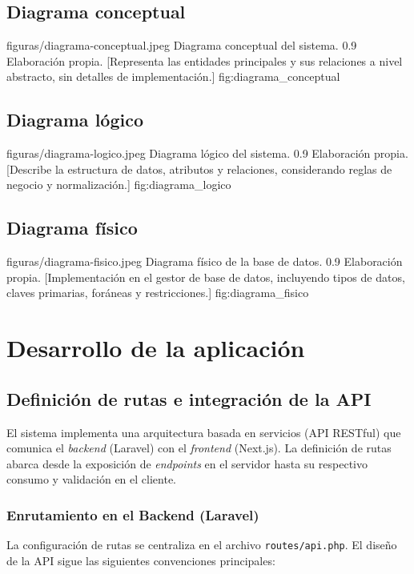 \documentclass[12pt,letterpaper]{report}
\begin{document}
	\subsection{Diagrama conceptual}
	
	\figuraAPA
	{figuras/diagrama-conceptual.jpeg}
	{Diagrama conceptual del sistema.}
	{0.9\textwidth}
	{Elaboración propia.}
	[Representa las entidades principales y sus relaciones a nivel abstracto, sin detalles de implementación.]
	{fig:diagrama_conceptual}
	
	
	\subsection{Diagrama lógico}
	
	\figuraAPA
	{figuras/diagrama-logico.jpeg}
	{Diagrama lógico del sistema.}
	{0.9\textwidth}
	{Elaboración propia.}
	[Describe la estructura de datos, atributos y relaciones, considerando reglas de negocio y normalización.]
	{fig:diagrama_logico}
	
	
	\subsection{Diagrama físico}
	
	\figuraAPA
	{figuras/diagrama-fisico.jpeg}
	{Diagrama físico de la base de datos.}
	{0.9\textwidth}
	{Elaboración propia.}
	[Implementación en el gestor de base de datos, incluyendo tipos de datos, claves primarias, foráneas y restricciones.]
	{fig:diagrama_fisico}
	
	\section{Desarrollo de la aplicación}
	
	\subsection{Definición de rutas e integración de la API}
	
	El sistema implementa una arquitectura basada en servicios (API RESTful) que comunica el \textit{back\-end} (Laravel) con el \textit{front\-end} (Next.js). La definición de rutas abarca desde la exposición de \textit{end\-points} en el servidor hasta su respectivo consumo y validación en el cliente.
	
	\subsubsection{Enrutamiento en el Backend (Laravel)}
	La configuración de rutas se centraliza en el archivo \texttt{routes/api.php}. El diseño de la API sigue las siguientes convenciones principales:
	
\end{document}

